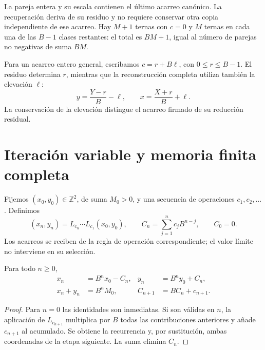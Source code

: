 La pareja entera y su escala contienen el último acarreo canónico. La
recuperación deriva de su residuo y no requiere conservar otra copia
independiente de ese acarreo. Hay \(M+1\) ternas con \(c=0\) y
\(M\) ternas en cada una de las \(B-1\) clases restantes: el total
es \(BM+1\), igual al número de parejas no negativas de suma \(BM\).

Para un acarreo entero general, escribamos
\(c=r+B\ell\), con \(0\leq r\leq B-1\). El residuo determina
\(r\), mientras que la reconstrucción completa utiliza también la
elevación \(\ell\):
\begin{equation}
 y=\frac{Y-r}{B}-\ell,\qquad
 x=\frac{X+r}{B}+\ell.
 \label{x_reciprocidad:lib03:elevacion}
\end{equation}
La conservación de la elevación distingue el acarreo firmado de su
reducción residual.

\section{Iteración variable y memoria finita completa}
\label{x_reciprocidad:lib03:memoria}

Fijemos \((x_0,y_0)\in\mathbb Z^2\), de suma \(M_0>0\), y una
secuencia de operaciones \(c_1,c_2,\ldots\). Definimos
\begin{equation}
 (x_n,y_n)=L_{c_n}\cdots L_{c_1}(x_0,y_0),\qquad
 C_n=\sum_{j=1}^n c_jB^{n-j},\qquad C_0=0.
 \label{x_reciprocidad:lib03:registro-acumulado}
\end{equation}
Los acarreos se reciben de la regla de operación correspondiente; el
valor límite no interviene en su selección.

\begin{theorem}
\label{x_reciprocidad:lib03:teo-acumulacion}
Para todo \(n\geq0\),
\begin{equation}
 \begin{aligned}
 x_n&=B^nx_0-C_n,& y_n&=B^ny_0+C_n,\\
 x_n+y_n&=B^nM_0,& C_{n+1}&=BC_n+c_{n+1}.
 \end{aligned}
 \label{x_reciprocidad:lib03:iteracion-exacta}
\end{equation}
\end{theorem}

\begin{proof}
Para \(n=0\) las identidades son inmediatas. Si son válidas en
\(n\), la aplicación de \(L_{c_{n+1}}\) multiplica por \(B\) todas
las contribuciones anteriores y añade \(c_{n+1}\) al acumulado.
Se obtiene la recurrencia y, por sustitución, ambas coordenadas de la
etapa siguiente. La suma elimina \(C_n\).
\end{proof}

